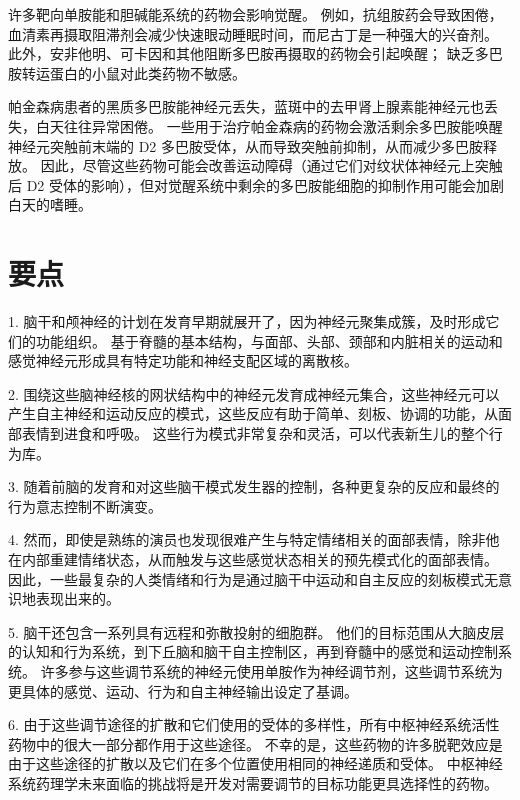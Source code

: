 许多靶向单胺能和胆碱能系统的药物会影响觉醒。
例如，抗组胺药会导致困倦，血清素再摄取阻滞剂会减少快速眼动睡眠时间，而尼古丁是一种强大的兴奋剂。
此外，安非他明、可卡因和其他阻断多巴胺再摄取的药物会引起唤醒；
缺乏多巴胺转运蛋白的小鼠对此类药物不敏感。


帕金森病患者的黑质多巴胺能神经元丢失，蓝斑中的去甲肾上腺素能神经元也丢失，白天往往异常困倦。
一些用于治疗帕金森病的药物会激活剩余多巴胺能唤醒神经元突触前末端的 D2 多巴胺受体，从而导致突触前抑制，从而减少多巴胺释放。
因此，尽管这些药物可能会改善运动障碍（通过它们对纹状体神经元上突触后 D2 受体的影响），但对觉醒系统中剩余的多巴胺能细胞的抑制作用可能会加剧白天的嗜睡。



\section{要点}

1. 脑干和颅神经的计划在发育早期就展开了，因为神经元聚集成簇，及时形成它们的功能组织。
基于脊髓的基本结构，与面部、头部、颈部和内脏相关的运动和感觉神经元形成具有特定功能和神经支配区域的离散核。


2. 围绕这些脑神经核的网状结构中的神经元发育成神经元集合，这些神经元可以产生自主神经和运动反应的模式，这些反应有助于简单、刻板、协调的功能，从面部表情到进食和呼吸。
这些行为模式非常复杂和灵活，可以代表新生儿的整个行为库。


3. 随着前脑的发育和对这些脑干模式发生器的控制，各种更复杂的反应和最终的行为意志控制不断演变。


4. 然而，即使是熟练的演员也发现很难产生与特定情绪相关的面部表情，除非他在内部重建情绪状态，从而触发与这些感觉状态相关的预先模式化的面部表情。
因此，一些最复杂的人类情绪和行为是通过脑干中运动和自主反应的刻板模式无意识地表现出来的。


5. 脑干还包含一系列具有远程和弥散投射的细胞群。
他们的目标范围从大脑皮层的认知和行为系统，到下丘脑和脑干自主控制区，再到脊髓中的感觉和运动控制系统。
许多参与这些调节系统的神经元使用单胺作为神经调节剂，这些调节系统为更具体的感觉、运动、行为和自主神经输出设定了基调。


6. 由于这些调节途径的扩散和它们使用的受体的多样性，所有中枢神经系统活性药物中的很大一部分都作用于这些途径。
不幸的是，这些药物的许多脱靶效应是由于这些途径的扩散以及它们在多个位置使用相同的神经递质和受体。
中枢神经系统药理学未来面临的挑战将是开发对需要调节的目标功能更具选择性的药物。


